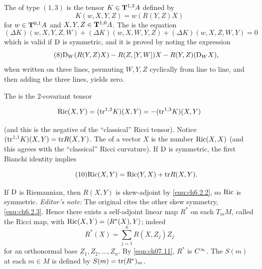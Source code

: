 \documentclass[../main]{subfiles}
\begin{document}
The  of type $(1, 3)$ is the tensor $K\in \tensorbundle{A}{1}{ 3}$ defined by 
\begin{equation}\tag{6}
\label{eqn:ch07.6} 
K(w, X, Y, Z) = w(R(Y, Z) X)
\end{equation}
for $w\in \tensorbundle{A}{0}{ 1}$ and $X, Y,Z\in\tensorbundle{A}{1}{ 0}$. The  is the equation 
\begin{equation}\tag{7}
\label{eqn:ch07.7}
(\Delta K)(w, X, Y, Z, W) + (\Delta K) (w, X, W, Y, Z) + (\Delta K)(w, X, Z, W, Y) = 0
\end{equation}
which is valid if $\connection$ is symmetric, and it is proved by noting the expression
\begin{equation}\tag{8}
\label{eqn:ch07.8}
\connection_W(R(Y, Z)X) - R(Z, [Y, W])X - R(Y, Z)(\connection_W X),
\end{equation}
when written on three lines, permuting $W, Y, Z$ cyclically from line to line, and then adding the three lines, yields zero.

The  is the $2$-covariant tensor 

\begin{equation}
\label{eqn:ch07.9}
\Ric(X, Y) = (\tr^{1, 2} K)(X, Y) = -(\tr^{1, 3}K)(X, Y)
\end{equation} 

(and this is the negative of the ``classical'' Ricci tensor). Notice \newline $(\tr^{1, 1} K)(X, Y) = \tr R(X, Y)$. The  of a vector $X$ is the number $\Ric(X, X)$ (and this agrees with the ``classical'' Ricci curvature). If $\connection$ is symmetric, the first Bianchi identity implies 

\begin{equation}\tag{10}
\label{eqn:ch07.10}
\Ric(X, Y) = \Ric(Y, X) + \tr R(X, Y).
\end{equation}

If $\connection$ is Riemannian, then $R(X,Y)$ is skew-adjoint by \ref{enu:ch6.2.2}, so $\Ric$ is symmetric. \emph{Editor's note:} The original cites the other skew symmetry, \ref{enu:ch6.2.3}. Hence there exists a self-adjoint linear map $R^\ast$ on each $T_mM$, called the Ricci map, with $\Ric(X,Y)=\ip{R^\ast(X)}Y$; indeed
\begin{equation}\tag{11}
\label{eqn:ch07.11}
R^\ast(X) = \sum_{j = 1}^n R(X, Z_j)Z_j
\end{equation}
for an orthonormal base $Z_1, Z_2, \ldots, Z_n$. By \eqref{eqn:ch07.11}, $R^\ast$ is $\CInfty$. The  $S(m)$ at each $m\in M$ is defined by $S(m) = \tr(R^\ast)_m$. 
\end{document}
